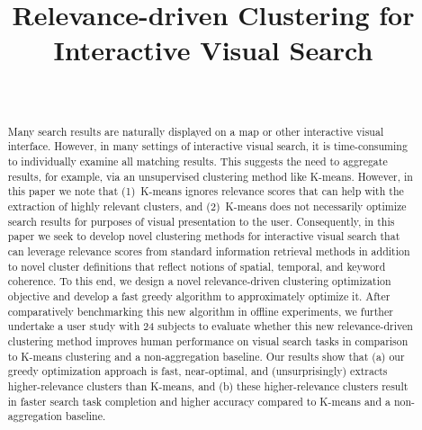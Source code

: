 \documentclass{sigchi}
\def\plaintitle{Relevance-driven Clustering for Interactive Visual Search}
\begin{document}
\title{\plaintitle}

\author{%
  \\}

\maketitle

\begin{abstract}

Many search results are naturally displayed on a map or other interactive visual interface.  However, in many settings of interactive visual search,  
it is time-consuming to individually examine all matching results.  This suggests the need to aggregate results, for example, via an unsupervised clustering method like K-means.  However, in this paper we note that (1)~K-means ignores relevance scores that can help with the extraction of highly relevant clusters, and (2)~K-means does not necessarily optimize search results for purposes of visual presentation to the user.  Consequently, in this paper we seek to develop novel clustering methods for interactive visual search  that can leverage relevance scores from standard information retrieval methods in addition to novel cluster definitions that reflect notions of spatial, temporal, and keyword coherence.  To this end, we design a novel relevance-driven clustering optimization objective and develop a fast greedy algorithm to approximately optimize it.  After comparatively benchmarking this new algorithm in offline experiments, we further undertake a user study with 24 subjects to evaluate whether this new relevance-driven clustering method improves human performance on visual search tasks in comparison to K-means clustering and a non-aggregation baseline.  Our results show that (a) our greedy optimization approach is fast, near-optimal, and (unsurprisingly) extracts higher-relevance clusters than K-means, and (b) these higher-relevance clusters result in faster search task completion and higher accuracy compared to K-means and a non-aggregation baseline.


\end{abstract}
\end{document}
